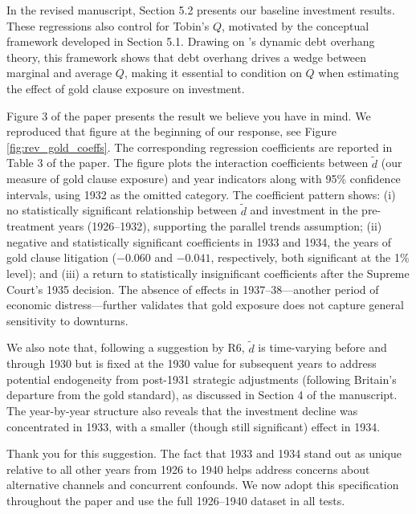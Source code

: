 \begin{itemize}
\begin{enumerate}
    \end{enumerate}

    In the revised manuscript, Section 5.2 presents our baseline investment results. These regressions also control for Tobin's $Q$, motivated by the conceptual framework developed in Section 5.1. Drawing on \cite{Hennessy2004}'s dynamic debt overhang theory, this framework shows that debt overhang drives a wedge between marginal and average $Q$, making it essential to condition on $Q$ when estimating the effect of gold clause exposure on investment.

    Figure 3 of the paper presents the result we believe you have in mind. We reproduced that figure at the beginning of our response, see Figure \ref{fig:rev_gold_coeffs}. The corresponding regression coefficients are reported in Table 3 of the paper. The figure plots the interaction coefficients between $\tilde{d}$ (our measure of gold clause exposure) and year indicators along with 95\% confidence intervals, using 1932 as the omitted category. The coefficient pattern shows: (i) no statistically significant relationship between $\tilde{d}$ and investment in the pre-treatment years (1926--1932), supporting the parallel trends assumption; (ii) negative and statistically significant coefficients in 1933 and 1934, the years of gold clause litigation ($-0.060$ and $-0.041$, respectively, both significant at the 1\% level); and (iii) a return to statistically insignificant coefficients after the Supreme Court's 1935 decision. The absence of effects in 1937--38---another period of economic distress---further validates that gold exposure does not capture general sensitivity to downturns.

    We also note that, following a suggestion by R6, $\tilde{d}$ is time-varying before and through 1930 but is fixed at the 1930 value for subsequent years to address potential endogeneity from post-1931 strategic adjustments (following Britain's departure from the gold standard), as discussed in Section 4 of the manuscript. The year-by-year structure also reveals that the investment decline was concentrated in 1933, with a smaller (though still significant) effect in 1934.

    Thank you for this suggestion. The fact that 1933 and 1934 stand out as unique relative to all other years from 1926 to 1940 helps address concerns about alternative channels and concurrent confounds. We now adopt this specification throughout the paper and use the full 1926--1940 dataset in all tests.
    

\end{itemize}
